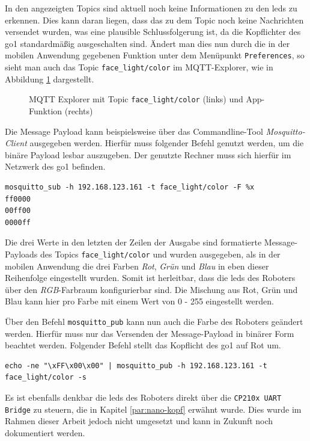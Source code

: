 In den angezeigten Topics sind aktuell noch keine Informationen zu den \glspl{led} zu erkennen.
Dies kann daran liegen, dass das zu dem Topic noch keine Nachrichten versendet wurden, was eine plausible Schlussfolgerung
ist, da die Kopflichter des \gls{go1} standardmäßig ausgeschalten sind.
Ändert man dies nun durch die in der mobilen Anwendung gegebenen Funktion unter dem Menüpunkt \texttt{Preferences}, so
sieht man auch das Topic \texttt{face\_light/color} im MQTT-Explorer, wie in Abbildung \ref{fig:app-mqtt-facelight} dargestellt.

\begin{figure}[h]
    \caption{MQTT Explorer mit Topic \texttt{face\_light/color} (links) und App-Funktion (rechts)}\label{fig:app-mqtt-facelight}
\end{figure}

Die Message Payload kann beispielsweise über das Commandline-Tool \emph{Mosquitto-Client} ausgegeben werden.
Hierfür muss folgender Befehl genutzt werden, um die binäre Payload lesbar auszugeben.
Der genutzte Rechner muss sich hierfür im Netzwerk des \gls{go1} befinden.

\begin{lstlisting}
mosquitto_sub -h 192.168.123.161 -t face_light/color -F %x
ff0000
00ff00
0000ff
\end{lstlisting}

\noindent Die drei Werte in den letzten der Zeilen der Ausgabe sind formatierte Message-Payloads des Topics \texttt{face\_light/color}
und wurden ausgegeben, als in der mobilen Anwendung die drei Farben \emph{Rot}, \emph{Grün} und \emph{Blau} in eben dieser
Reihenfolge eingestellt wurden.
Somit ist herleitbar, dass die \glspl{led} des Roboters über den \emph{RGB}-Farbraum konfigurierbar sind.
Die Mischung aus Rot, Grün und Blau kann hier pro Farbe mit einem Wert von \num{0} - \num{255} eingestellt werden.

Über den Befehl \texttt{mosquitto\_pub} kann nun auch die Farbe des Roboters geändert werden.
Hierfür muss nur das Versenden der Message-Payload in binärer Form beachtet werden.
Folgender Befehl stellt das Kopflicht des \gls{go1} auf Rot um.

\begin{lstlisting}
echo -ne "\xFF\x00\x00" | mosquitto_pub -h 192.168.123.161 -t face_light/color -s
\end{lstlisting}

\noindent Es ist ebenfalls denkbar die \glspl{led} des Roboters direkt über die \texttt{CP210x UART Bridge} zu steuern, die in Kapitel
\ref{par:nano-kopf} erwähnt wurde.
Dies wurde im Rahmen dieser Arbeit jedoch nicht umgesetzt und kann in Zukunft noch dokumentiert werden.
